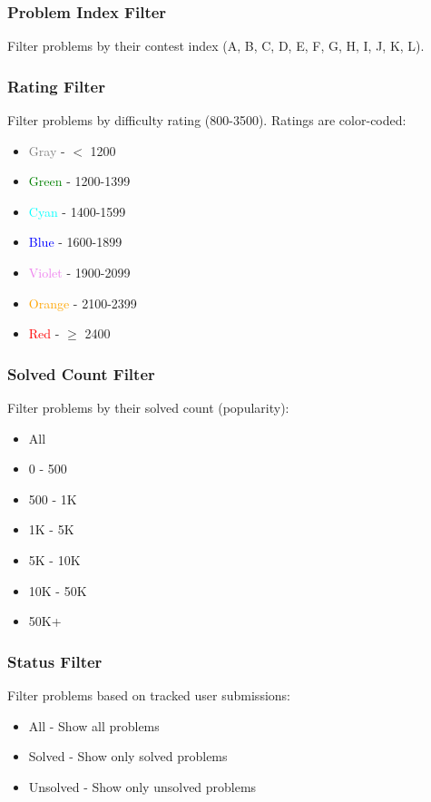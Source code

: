\documentclass[12pt,a4paper]{article}
\begin{document}
\subsubsection{Problem Index Filter}
Filter problems by their contest index (A, B, C, D, E, F, G, H, I, J, K, L).

\subsubsection{Rating Filter}
Filter problems by difficulty rating (800-3500). Ratings are color-coded:
\begin{itemize}[leftmargin=*]
    \item \textcolor{gray}{Gray} - $<$ 1200
    \item \textcolor{green}{Green} - 1200-1399
    \item \textcolor{cyan}{Cyan} - 1400-1599
    \item \textcolor{blue}{Blue} - 1600-1899
    \item \textcolor{violet}{Violet} - 1900-2099
    \item \textcolor{orange}{Orange} - 2100-2399
    \item \textcolor{red}{Red} - $\geq$ 2400
\end{itemize}

\subsubsection{Solved Count Filter}
Filter problems by their solved count (popularity):
\begin{itemize}[leftmargin=*]
    \item All
    \item 0 - 500
    \item 500 - 1K
    \item 1K - 5K
    \item 5K - 10K
    \item 10K - 50K
    \item 50K+
\end{itemize}

\subsubsection{Status Filter}
Filter problems based on tracked user submissions:
\begin{itemize}[leftmargin=*]
    \item All - Show all problems
    \item Solved - Show only solved problems
    \item Unsolved - Show only unsolved problems
\end{itemize}
\end{document}
